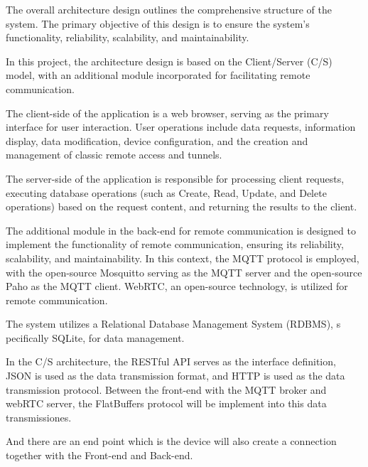 
The overall architecture design outlines the comprehensive structure of the system. 
The primary objective of this design is to ensure the system's functionality, 
reliability, scalability, and maintainability.

In this project, the architecture design is based on the Client/Server (C/S) model, 
with an additional module incorporated for facilitating remote communication.

The client-side of the application is a web browser, serving as the primary interface 
for user interaction. User operations include data requests, information display, 
data modification, device configuration, and the creation 
and management of classic remote access and tunnels.

The server-side of the application is responsible for processing client requests, 
executing database operations (such as Create, Read, Update, and Delete operations) 
based on the request content, and returning the results to the client.

The additional module in the back-end for remote communication is designed to implement 
the functionality of remote communication, ensuring its reliability, scalability, 
and maintainability. In this context, the MQTT protocol is employed, 
with the open-source Mosquitto serving as the MQTT server 
and the open-source Paho as the MQTT client. WebRTC, an open-source technology, 
is utilized for remote communication.

The system utilizes a Relational Database Management System (RDBMS), s
pecifically SQLite, for data management.

In the C/S architecture, the RESTful API serves as the interface definition, 
JSON is used as the data transmission format, 
and HTTP is used as the data transmission protocol.
Between the front-end with the MQTT broker and webRTC server, the FlatBuffers protocol
will be implement into this data transmissiones. 

And there are an end point which is the device will also create a connection together
with the Front-end and Back-end.

